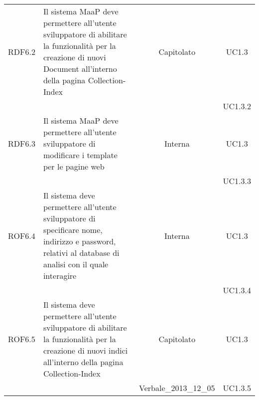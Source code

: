 \begin{longtable}{|c|p{6cm}|c|c|}
\midrule
RDF6.2
& Il sistema MaaP deve permettere all'utente sviluppatore di abilitare la funzionalità per la creazione di nuovi Document all'interno della pagina Collection-Index
& Capitolato
& UC1.3\\
& &  & UC1.3.2
\\

\midrule
RDF6.3
& Il sistema MaaP deve permettere all'utente sviluppatore di modificare i template per le pagine web
& Interna
& UC1.3\\
& & & UC1.3.3
\\

\midrule
ROF6.4
& Il sistema deve permettere all'utente sviluppatore di specificare nome, indirizzo e password, relativi al database di analisi con il quale interagire
& Interna
& UC1.3\\
& & & UC1.3.4
\\

\midrule
ROF6.5
& Il sistema deve permettere all'utente sviluppatore di abilitare la funzionalità per la creazione di nuovi indici all'interno della pagina Collection-Index
& Capitolato
& UC1.3\\
& & Verbale\_2013\_12\_05 & UC1.3.5
\\


\end{longtable}

\newpage
